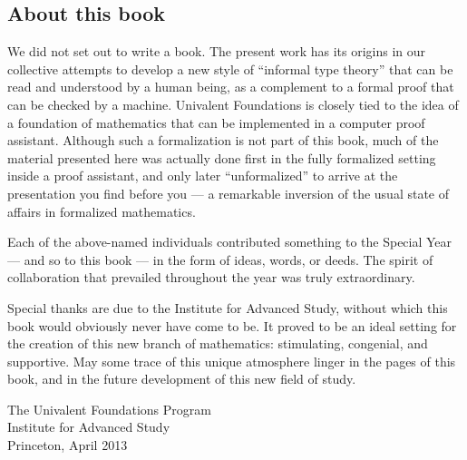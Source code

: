\subsection*{About this book}

We did not set out to write a book. The present work has its origins in our collective attempts to develop a new style of ``informal type theory'' that can be read and understood by a human being, as a complement to a formal proof that can be checked by a machine.  
Univalent Foundations is closely tied to the idea of a foundation of mathematics that can be implemented in a computer proof assistant.  Although such a formalization is not part of this book, much of the material presented here was actually done first in the fully formalized setting inside a proof assistant, and only later ``unformalized'' to arrive at the presentation you find before you --- a remarkable inversion of the usual state of affairs in formalized mathematics.  

Each of the above-named individuals contributed something to the Special Year --- and so to this book --- in the form of ideas, words, or deeds.  The spirit of collaboration that prevailed throughout the year was truly extraordinary. 

\mentalpause

Special thanks are due to the Institute for Advanced Study, without which this book would obviously never have come to be.  It proved  to be an ideal setting for the creation of this new branch of mathematics: stimulating, congenial, and supportive.  May some trace of this unique atmosphere linger in the pages of this book, and in the future development of this new field of study.

\bigskip

\begin{flushright}
The Univalent Foundations Program\\
Institute for Advanced Study\\
Princeton, April 2013
\end{flushright}

